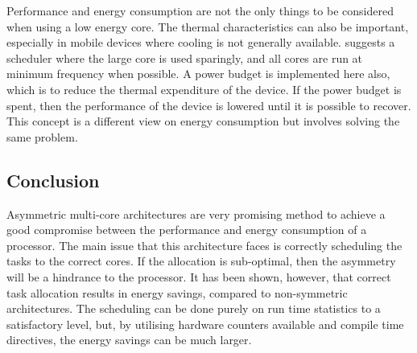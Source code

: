 Performance and energy consumption are not the only things to be considered when using a low energy core.
The thermal characteristics can also be important, especially in mobile devices where cooling is not generally available. 
\cite{muthukaruppan2013hierarchical} suggests a scheduler where the large core is used sparingly, and all cores are run at minimum frequency when possible. 
A power budget is implemented here also, which is to reduce the thermal expenditure of the device. 
If the power budget is spent, then the performance of the device is lowered until it is possible to recover. 
This concept is a different view on energy consumption but involves solving the same problem. 


\subsection{Conclusion}


Asymmetric multi-core architectures are very promising method to achieve a good compromise between the performance and energy consumption of a processor. 
The main issue that this architecture faces is correctly scheduling the tasks to the correct cores. 
If the allocation is sub-optimal, then the asymmetry will be a hindrance to the processor. 
It has been shown, however, that correct task allocation results in energy savings, compared to non-symmetric architectures. 
The scheduling can be done purely on run time statistics to a satisfactory level, but, by utilising hardware counters available and compile time directives, the energy savings can be much larger.
